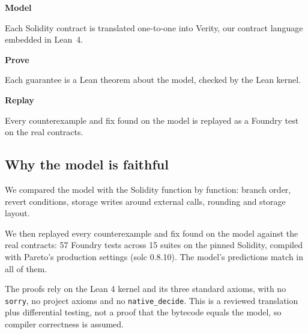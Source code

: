 \documentclass[10.5pt,a4paper]{article}
\newcommand{\code}[1]{\texttt{#1}}
\begin{document}
\begin{tcbraster}[raster columns=3,raster equal height,raster column skip=10pt]
\begin{card}
{\fontsize{12}{15}\selectfont\bfseries Model}\par\vspace{2pt}
{\fontsize{9.3}{13.2}\selectfont\color{muted}\raggedright Each Solidity contract is translated one-to-one into Verity, our contract language embedded in Lean~4.\par}
\end{card}
\begin{card}
{\fontsize{12}{15}\selectfont\bfseries Prove}\par\vspace{2pt}
{\fontsize{9.3}{13.2}\selectfont\color{muted}\raggedright Each guarantee is a Lean theorem about the model, checked by the Lean kernel.\par}
\end{card}
\begin{card}
{\fontsize{12}{15}\selectfont\bfseries Replay}\par\vspace{2pt}
{\fontsize{9.3}{13.2}\selectfont\color{muted}\raggedright Every counterexample and fix found on the model is replayed as a Foundry test on the real contracts.\par}
\end{card}
\end{tcbraster}

\subsection{Why the model is faithful}

We compared the model with the Solidity function by function: branch order, revert conditions, storage writes around external calls, rounding and storage layout.

We then replayed every counterexample and fix found on the model against the real contracts: 57 Foundry tests across 15 suites on the pinned Solidity, compiled with Pareto's production settings (solc 0.8.10). The model's predictions match in all of them.

The proofs rely on the Lean 4 kernel and its three standard axioms, with no \code{sorry}, no project axioms and no \code{native\_decide}. This is a reviewed translation plus differential testing, not a proof that the bytecode equals the model, so compiler correctness is assumed.
\end{document}
